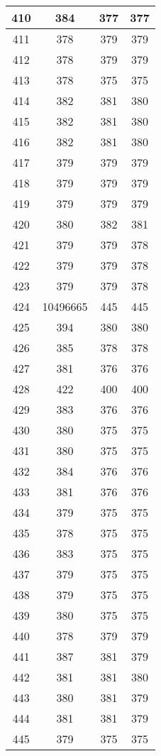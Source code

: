 \begin{table}[H]
\begin{tabular}{|c|c|c|c|}
\hline
410 & 384 & 377 & 377 \\
\hline
411 & 378 & 379 & 379 \\
\hline
412 & 378 & 379 & 379 \\
\hline
413 & 378 & 375 & 375 \\
\hline
414 & 382 & 381 & 380 \\
\hline
415 & 382 & 381 & 380 \\
\hline
416 & 382 & 381 & 380 \\
\hline
417 & 379 & 379 & 379 \\
\hline
418 & 379 & 379 & 379 \\
\hline
419 & 379 & 379 & 379 \\
\hline
420 & 380 & 382 & 381 \\
\hline
421 & 379 & 379 & 378 \\
\hline
422 & 379 & 379 & 378 \\
\hline
423 & 379 & 379 & 378 \\
\hline
424 & 10496665 & 445 & 445 \\
\hline
425 & 394 & 380 & 380 \\
\hline
426 & 385 & 378 & 378 \\
\hline
427 & 381 & 376 & 376 \\
\hline
428 & 422 & 400 & 400 \\
\hline
429 & 383 & 376 & 376 \\
\hline
430 & 380 & 375 & 375 \\
\hline
431 & 380 & 375 & 375 \\
\hline
432 & 384 & 376 & 376 \\
\hline
433 & 381 & 376 & 376 \\
\hline
434 & 379 & 375 & 375 \\
\hline
435 & 378 & 375 & 375 \\
\hline
436 & 383 & 375 & 375 \\
\hline
437 & 379 & 375 & 375 \\
\hline
438 & 379 & 375 & 375 \\
\hline
439 & 380 & 375 & 375 \\
\hline
440 & 378 & 379 & 379 \\
\hline
441 & 387 & 381 & 379 \\
\hline
442 & 381 & 381 & 380 \\
\hline
443 & 380 & 381 & 379 \\
\hline
444 & 381 & 381 & 379 \\
\hline
445 & 379 & 375 & 375 \\
\hline

\end{tabular}
\end{table}
